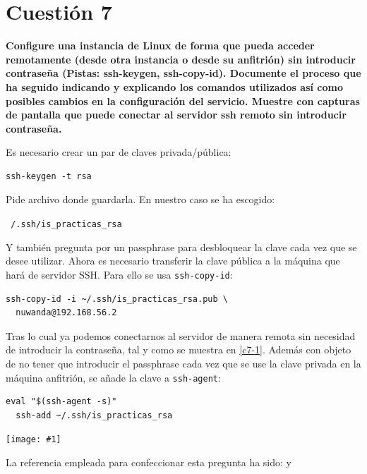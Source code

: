 \documentclass[a4paper,11pt]{article}
\newenvironment{answer}{%
\begin{list}{}{%
}%
\item[]}{\end{list}}
\newcommand{\imagen}[4]{
  \begin{minipage}{\linewidth}
    \centering
    \texttt{[image: \#1]}
    \captionof{figure}{#2}
    \label{#3}
  \end{minipage} 
}
\begin{document}
\section{Cuestión 7}
\textbf{Configure una instancia de Linux de forma que pueda acceder remotamente (desde otra instancia o desde su anfitrión) 
sin introducir contraseña (Pistas: ssh-keygen, ssh-copy-id). Documente el proceso que ha seguido indicando y explicando los
comandos utilizados así como posibles cambios en la configuración del servicio. Muestre con capturas de pantalla que puede 
conectar al servidor ssh remoto sin introducir contraseña.}
\begin{answer}
  Es necesario crear un par de claves privada/pública:
  \begin{lstlisting}[style=BashInputStyle]
  ssh-keygen -t rsa
  \end{lstlisting}
  
  Pide archivo donde guardarla. En nuestro caso se ha escogido:\\
  \begin{center} \texttt{~/.ssh/is\_practicas\_rsa} \end{center}
  Y también pregunta por un passphrase para desbloquear la clave cada vez que se
  desee utilizar. Ahora es necesario transferir la clave pública a la máquina que hará de servidor SSH.
  Para ello se usa \texttt{ssh-copy-id}:
  \begin{lstlisting}[style=BashInputStyle]
  ssh-copy-id -i ~/.ssh/is_practicas_rsa.pub \
  nuwanda@192.168.56.2
  \end{lstlisting}
  
  Tras lo cual ya podemos conectarnos al servidor de manera remota sin necesidad
  de introducir la contraseña, tal y como se muestra en \ref{c7-1}. Además con objeto de
  no tener que introducir el passphrase cada vez que se use la clave privada
  en la máquina anfitrión, se añade la clave a \texttt{ssh-agent}:
  \begin{lstlisting}[style=BashInputStyle]
  eval "$(ssh-agent -s)"
  ssh-add ~/.ssh/is_practicas_rsa
  \end{lstlisting}
  
  \imagen{../images/2c7-1.jpeg}{SSH con publickey}{c7-1}{1}
  
  La referencia empleada para confeccionar esta pregunta ha sido: \cite{sshcopy} y 
  \cite{ssheval}
\end{answer}
\end{document}
